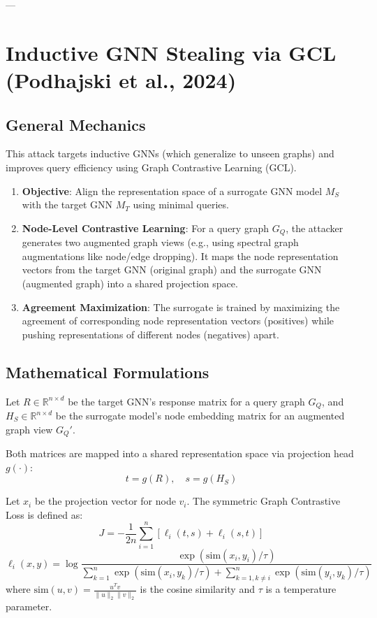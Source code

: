 \documentclass{article}
\begin{document}
---

\section{Inductive GNN Stealing via GCL (Podhajski et al., 2024)}

\subsection{General Mechanics}
This attack targets inductive GNNs (which generalize to unseen graphs) and improves query efficiency using Graph Contrastive Learning (GCL).
\begin{enumerate}
    \item \textbf{Objective}: Align the representation space of a surrogate GNN model $M_S$ with the target GNN $M_T$ using minimal queries.
    \item \textbf{Node-Level Contrastive Learning}: For a query graph $G_Q$, the attacker generates two augmented graph views (e.g., using spectral graph augmentations like node/edge dropping). It maps the node representation vectors from the target GNN (original graph) and the surrogate GNN (augmented graph) into a shared projection space.
    \item \textbf{Agreement Maximization}: The surrogate is trained by maximizing the agreement of corresponding node representation vectors (positives) while pushing representations of different nodes (negatives) apart.
\end{enumerate}

\subsection{Mathematical Formulations}
Let $R \in \mathbb{R}^{n \times d}$ be the target GNN's response matrix for a query graph $G_Q$, and $H_S \in \mathbb{R}^{n \times d}$ be the surrogate model's node embedding matrix for an augmented graph view $G_Q'$. 

Both matrices are mapped into a shared representation space via projection head $g(\cdot)$:
\begin{equation}
    t = g(R), \quad s = g(H_S)
\end{equation}

Let $x_i$ be the projection vector for node $v_i$. The symmetric Graph Contrastive Loss is defined as:
\begin{equation}
    J = -\frac{1}{2n}\sum_{i=1}^n \left[ \ell_i(t, s) + \ell_i(s, t) \right]
\end{equation}
\begin{equation}
    \ell_i(x, y) = \log \frac{\exp(\text{sim}(x_i, y_i)/\tau)}{\sum_{k=1}^n \exp(\text{sim}(x_i, y_k)/\tau) + \sum_{k=1, k\neq i}^n \exp(\text{sim}(y_i, y_k)/\tau)}
\end{equation}
where $\text{sim}(u, v) = \frac{u^T v}{\|u\|_2 \|v\|_2}$ is the cosine similarity and $\tau$ is a temperature parameter.
\end{document}
